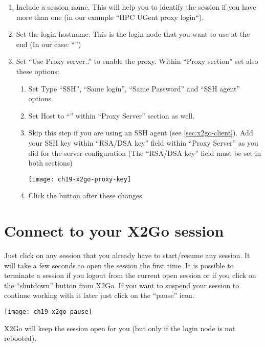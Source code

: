 \begin{enumerate}
    \item  Include a session name. This will help you to identify 
    the session if you have more than one (in our example ``HPC UGent proxy login``).
    \item  Set the login hostname. This is the login node that you want to use at the end
    (In our case: ``\strong{\emph{\loginhost{}}}'')
    \item  Set ``Use Proxy server..'' to enable the proxy.
    Within ``Proxy section'' set also these options:
    \begin{enumerate}
      \item  Set Type ``SSH'', ``Same login'', ``Same Password'' and ``SSH agent'' options.
      \item  Set Host to ``\strong{\emph{\loginnode}}'' within ``Proxy Server'' section as well.
      \item  Skip this step if you are using an SSH agent (see \autoref{sec:x2go-client}).
      Add your  SSH key within ``RSA/DSA key'' field within ``Proxy Server'' as you
      did for the server configuration (The ``RSA/DSA key'' field must be set in both sections)
      \begin{center}
       \texttt{[image: ch19-x2go-proxy-key]}
      \end{center}
      \item  Click the  button after these changes.
    \end{enumerate}
\end{enumerate}

\section{Connect to your X2Go session}
\label{sec:connect-x2go}
Just click on any session that you already have to start/resume any session. It will take a few seconds to open the session the first time.
It is possible to terminate a session if you logout from the current open session or if you click on the ``shutdown'' button from X2Go.
If you want to suspend your session to continue working with it later just click on the ``pause'' icon.

\begin{center}
  \texttt{[image: ch19-x2go-pause]}
\end{center}

X2Go will keep the session open for you (but only if the login node is not rebooted).

